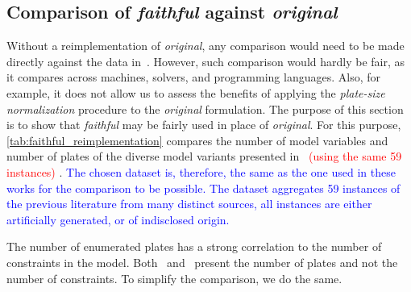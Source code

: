 \documentclass[smallextended]{svjour3}       %
\newif\iffinalversion
\newcommand{\newtext}[1]{\iffinalversion%
#1%
\else%
\textcolor{blue}{#1}%
\fi%
}
\newcommand{\oldtext}[1]{\iffinalversion%
#1%
\else%
\textcolor{red}{#1}%
\fi%
}
\begin{document}
\begin{comment}
In \autoref{tab:lp_method_comparison}, \emph{Dual Simplex} and \emph{Barrier} indicate the respective algorithm was used for all LPs and root node relaxations;
and \emph{DS + B} means that \emph{Dual Simplex} was used to solve all LPs inside the pricing phase and \emph{Barrier} was used to solve the root node relaxation of the final model.
The columns \emph{N. P.} (\emph{Not Priced}) and \emph{Priced} display the time to solve (in seconds) using the aforementioned variant.
The columns \emph{R.\%} refer to the per cent of the time spent by \emph{Not Priced} in the root node relaxation of the final model.

The following conclusions can be derived from \autoref{tab:lp_method_comparison}.
Using the \emph{Barrier} algorithm in the pricing phase is not viable.
This impracticality happens because the pricing phase includes an iterative variable pricing phase.
This iterative phase repeatedly adds variables to one LP model and solve it again.
The \emph{Barrier} algorithm solves every LP from scratch;
the \emph{Dual Simplex} reuses the previous basis and saves considerable effort.
However, \emph{Barrier} performs better if there is no previous base to reuse.
Consequently, the configuration chosen was \emph{Dual Simplex} for the pricing phase, and \emph{Barrier} for the root relaxation of the final model.
\end{comment}

\subsection{Comparison of \emph{faithful} against \emph{original}}
\label{sec:faithful_reimplementation}

Without a reimplementation of \emph{original}, any comparison would need to be made directly against the data in~\cite{dimitri_thesis}.
However, such comparison would hardly be fair, as it compares across machines, solvers, and programming languages.
Also, for example, it does not allow us to assess the benefits of applying the \emph{plate-size normalization} procedure to the \emph{original} formulation.
The purpose of this section is to show that \emph{faithful} may be fairly used in place of \emph{original}.
For this purpose, \autoref{tab:faithful_reimplementation} compares the number of model variables and number of plates of the diverse model variants presented in~\cite{furini:2016,dimitri_thesis}\oldtext{(using the same 59 instances)}.
\newtext{The chosen dataset is, therefore, the same as the one used in these works for the comparison to be possible. The dataset aggregates 59 instances of the previous literature from many distinct sources, all instances are either artificially generated, or of indisclosed origin.}
The number of enumerated plates has a strong correlation to the number of constraints in the model.
Both~\cite{furini:2016} and~\cite{dimitri_thesis} present the number of plates and not the number of constraints.
To simplify the comparison, we do the same.
\end{document}
